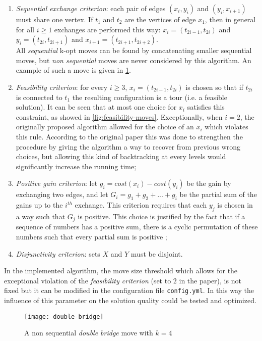 \begin{enumerate}
	\item \emph{Sequential exchange criterion}: each pair of edges $(x_i, y_i)$ and $(y_i, x_{i+1})$ must share one vertex. If $t_1$ and $t_2$ are the vertices of edge $x_1$, then in general for all $i \ge 1$ exchanges are performed this way: $x_i=(t_{2i-1}, t_{2i})$ and $y_i=(t_{2i}, t_{2i+1})$ and $x_{i+1}=(t_{2i+1}, t_{2i+2})$.\\ All \emph{sequential} k-opt moves can be found by concatenating smaller sequential moves, but \emph{non sequential} moves are never considered by this algorithm. An example of such a move is given in \cref{fig:doublebridge}.
	\item \emph{Feasibility criterion}: for every $i \ge 3$, $x_i=(t_{2i-1}, t_{2i})$ is chosen so that if $t_{2i}$ is connected to $t_1$ the resulting configuration is a tour (i.e. a feasible solution). It can be seen that at most one choice for $x_i$ satisfies this constraint, as showed in \cref{fig:feasibility-moves}. Exceptionally, when $i=2$, the originally proposed algorithm allowed for the choice of an $x_i$ which violates this rule. According to the original paper this was done to strengthen the procedure by giving the algorithm a way to recover from previous wrong choices, but allowing this kind of backtracking at every levels would significantly increase the running time;
	\item \emph{Positive gain criterion}: let $g_i=cost(x_i) - cost(y_i)$ be the gain by exchanging two edges, and let $G_i=g_1+g_2+...+g_i$ be the partial sum of the gains up to the $i^{th}$ exchange. This criterion requires that each $y_j$ is chosen in a way such that $G_j$ is positive. This choice is justified by the fact that if a sequence of numbers has a positive sum, there is a cyclic permutation of these numbers such
	that every partial sum is positive \cite{Helsgaun2000};
	\item \emph{Disjunctivity criterion}: sets $X$ and $Y$ must be disjoint. 
\end{enumerate}
In the implemented algorithm, the move size threshold which allows for the exceptional violation of the \emph{feasibility criterion} (set to $2$ in the paper), is not fixed but it can be modified in the configuration file \texttt{config.yml}. In this way the influence of this parameter on the solution quality could be tested and optimized.

\begin{figure}[h]
	\centering
	\texttt{[image: double-bridge]}
	\caption{A non sequential \emph{double bridge} move with $k=4$}
	\label{fig:doublebridge}
\end{figure}

